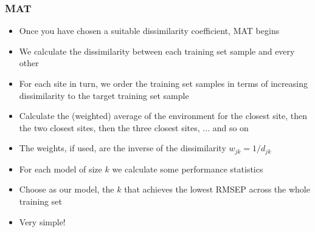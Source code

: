 \documentclass{beamer}
\begin{document}
\begin{frame}
    \frametitle{MAT}
    \begin{itemize}
        \item Once you have chosen a suitable dissimilarity coefficient, MAT begins
        \item We calculate the dissimilarity between each training set sample and every other
        \item For each site in turn, we order the training set samples in terms of increasing dissimilarity to the target training set sample
        \item Calculate the (weighted) average of the environment for the closest site, then the two closest sites, then the three closest sites, ... and so on
        \item The weights, if used, are the inverse of the dissimilarity $w_{jk} = 1 / d_{jk}$
        \item For each model of size $k$ we calculate some performance statistics
        \item Choose as our model, the $k$ that achieves the lowest RMSEP across the whole training set
        \item Very simple!
    \end{itemize}
\end{frame}
\end{document}
